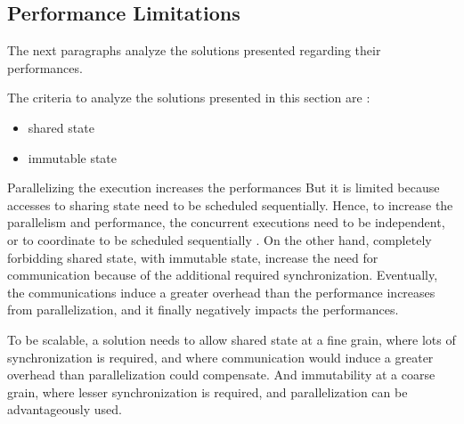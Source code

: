 \subsection{Performance Limitations} \label{chapter3:software-maintainability:performance-limitations}

The next paragraphs analyze the solutions presented regarding their performances.

The criteria to analyze the solutions presented in this section are :
\begin{itemize}
\item shared state
\item immutable state
\end{itemize}


Parallelizing the execution increases the performances \cite{Amdahl1967,Gunther1993}
But it is limited because accesses to sharing state need to be scheduled sequentially.
Hence, to increase the parallelism and performance, the concurrent executions need to be independent, or to coordinate to be scheduled sequentially \cite{Gustafson1988,Gunther1996,Nelson1996,Gunther2002}.
On the other hand, completely forbidding shared state, with immutable state, increase the need for communication because of the additional required synchronization.
Eventually, the communications induce a greater overhead than the performance increases from parallelization, and it finally negatively impacts the performances.

To be scalable, a solution needs to allow shared state at a fine grain, where lots of synchronization is required, and where communication would induce a greater overhead than parallelization could compensate. 
And immutability at a coarse grain, where lesser synchronization is required, and parallelization can be advantageously used.







